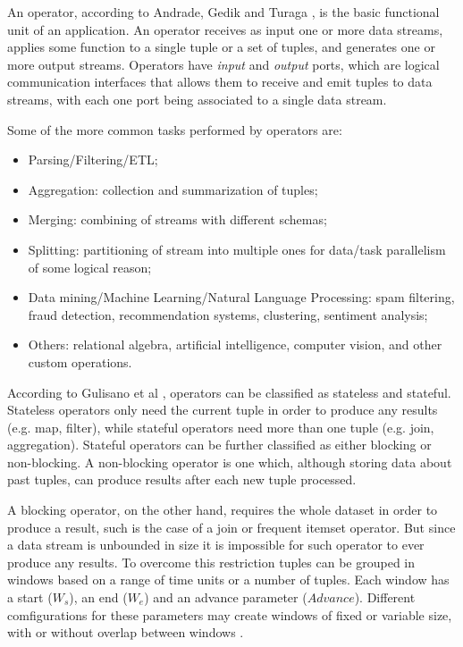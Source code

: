 \documentclass[ppgc,diss,english]{iiufrgs}
\begin{document}
An operator, according to Andrade, Gedik and Turaga \cite{andrade2014fundamentals}, is the basic functional unit of an application. An operator receives as input one or more data streams, applies some function to a single tuple or a set of tuples, and generates one or more output streams. Operators have \emph{input} and \emph{output} ports, which are logical communication interfaces that allows them to receive and emit tuples to data streams, with each one port being associated to a single data stream.

Some of the more common tasks performed by operators are:

\begin{itemize}
\item Parsing/Filtering/ETL;
\item Aggregation: collection and summarization of tuples;
\item Merging: combining of streams with different schemas;
\item Splitting: partitioning of stream into multiple ones for data/task parallelism of some logical reason;
\item Data mining/Machine Learning/Natural Language Processing: spam filtering, fraud detection, recommendation systems, clustering, sentiment analysis;
\item Others: relational algebra, artificial intelligence, computer vision, and other custom operations.
\end{itemize}

According to Gulisano et al \cite{gulisano2010streamcloud}, operators can be classified as stateless and stateful. Stateless operators only need the current tuple in order to produce any results (e.g. map, filter), while stateful operators need more than one tuple (e.g. join, aggregation). Stateful operators can be further classified as either blocking or non-blocking. A non-blocking operator is one which, although storing data about past tuples, can produce results after each new tuple processed.

A blocking operator, on the other hand, requires the whole dataset in order to produce a result, such is the case of a join or frequent itemset operator. But since a data stream is unbounded in size it is impossible for such operator to ever produce any results. To overcome this restriction tuples can be grouped in windows based on a range of time units or a number of tuples. Each window has a start ($W_s$), an end ($W_e$) and an advance parameter ($Advance$). Different comfigurations for these parameters may create windows of fixed or variable size, with or without overlap between windows \cite{gulisano2012streamcloud}.
\end{document}
